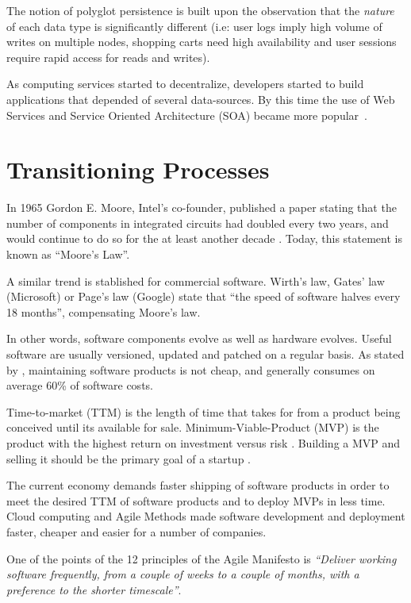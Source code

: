 The notion of polyglot persistence is built upon the observation that the \textit{nature} of each data type is significantly different (i.e: user logs imply high volume of writes on multiple nodes, shopping carts need high availability and user sessions require rapid access for reads and writes). 

As computing services started to decentralize, developers started to build applications that depended of several data-sources. 
By this time the use of Web Services and Service Oriented Architecture (SOA) became more popular~\cite{Armbrust09m.:above}. 



\section{Transitioning Processes}

In 1965 Gordon E. Moore, Intel's co-founder, published a paper stating that the number of components in integrated circuits had doubled every two years, and would continue to do so for the at least another decade \cite{658762}. Today, this statement is known as ``Moore's Law''.

A similar trend is stablished for commercial software. Wirth's law, Gates' law (Microsoft) or Page's law (Google) state that ``the speed of software halves every 18 months'', compensating Moore's law. \cite{wirth1995a}\cite{brinbreaking}

In other words, software components evolve as well as hardware evolves. Useful software are usually versioned, updated and patched on a regular basis. As stated by \cite{922739}, maintaining software products is not cheap, and generally consumes on average 60\% of software costs.

Time-to-market (TTM) is the length of time that takes for from a product being conceived until its available for sale. Minimum-Viable-Product (MVP) is the product with the highest return on investment versus risk \cite{blank2013four}. Building a MVP and selling it should be the primary goal of a startup \cite{blank2013four}. 

The current economy demands faster shipping of software products in order to meet the desired TTM of software products and to deploy MVPs in less time. Cloud computing and Agile Methods made software development and deployment faster, cheaper and easier for a number of companies. 

One of the points of the 12 principles of the Agile Manifesto \cite{fowler2001agile} is \textit{``Deliver working software frequently, from a couple of weeks to a couple of months, with a preference to the shorter timescale''}.

